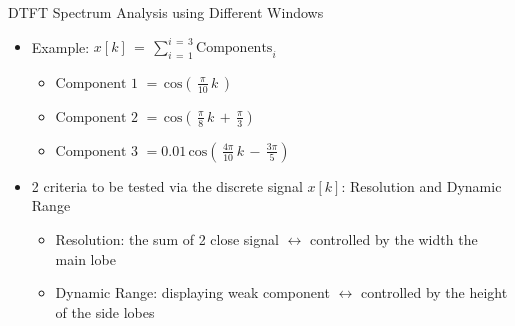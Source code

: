 \begin{frame}[t,allowframebreaks]{DTFT Spectrum Analysis using Different Windows}

\begin{itemize}

\item Example: $x[k] \, = \,\displaystyle\sum_{i \, = \, 1}^{i \, = \, 3} \text{Components}_i$

\begin{itemize}
\item $\text{Component 1 } = \, \text{cos} \left(\, \displaystyle\frac{\pi}{10} \, k \,\right) $
\item $ \text{Component 2 } = \,  \text{cos} \left(\, \displaystyle\frac{\pi}{8} \, k \, + \, \displaystyle\frac{\pi}{3} \right) $
\item $ \text{Component 3 } =  0.01 \, \text{cos} \left(\, \displaystyle\frac{4 \pi}{10} \, k \, - \,\displaystyle\frac{3 \pi }{5} \right) $ 
\end{itemize}


\item 2 criteria to be tested via the discrete signal $x[k]$: Resolution and Dynamic Range

 \begin{itemize}
 \item Resolution: the sum of 2 close signal $\leftrightarrow$ controlled by the width the main lobe
 
 \item Dynamic Range: displaying weak component $\leftrightarrow$ controlled by the height of the side lobes
 \end{itemize}


\end{itemize}

\end{frame}

